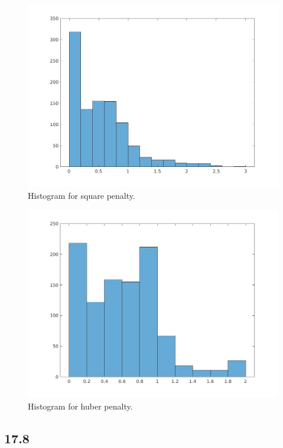 \documentclass[12pt]{article}
\begin{document}
\begin{figure}[h]
\centering
\includegraphics[scale=.25]{histogram_square_penalty.jpg}
\caption{Histogram for square penalty.}
\end{figure}

\begin{figure}[h]
\centering
\includegraphics[scale=.25]{histogram_huber_penalty.jpg}
\caption{Histogram for huber penalty.}
\end{figure}

\subsection*{17.8}
\end{document}
